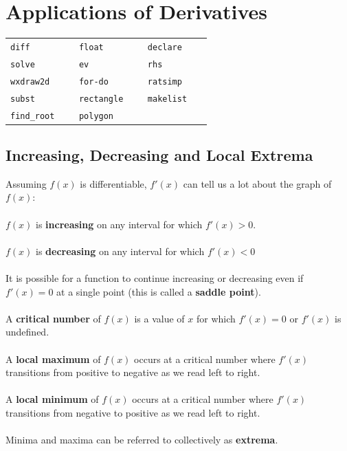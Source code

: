 \documentclass[10.5pt,twoside]{report}
\theoremstyle{definition}
\begin{document}
\pagebreak

\chapter{Applications of Derivatives}

\vspace*{\fill}

\minitoc

\vspace*{\fill}


\newline
\newline

\begin{tabular}{l l l}
 \verb|diff   |   &\verb|float   |   &\verb|declare   |   \\
 \verb|solve   |   &\verb|ev   |   &\verb|rhs   |   \\
 \verb|wxdraw2d   |   &\verb|for-do   |   &\verb|ratsimp   |   \\
 \verb|subst   |   &\verb|rectangle   |   &\verb|makelist   |   \\
 \verb|find_root   |   &\verb|polygon   |   &\verb|   |   \\
\end{tabular}



\pagebreak


\section{Increasing, Decreasing and Local Extrema}\label{Increasing, Decreasing and Local Extrema}

Assuming $f(x)$ is differentiable, $f'(x)$ can tell us a lot about the graph of $f(x)$:\\
${}$\\
$f(x)$ is \textbf{increasing} on any interval for which $f'(x)>0$.\\
${}$\\
$f(x)$ is \textbf{decreasing} on any interval for which $f'(x)<0$\\
${}$\\
It is possible for a function to continue increasing or decreasing even if $f'(x)=0$ at a single point (this is called a \textbf{saddle point}).\\
${}$\\

A \textbf{critical number} of $f(x)$ is a value of $x$ for which $f'(x)=0$ or $f'(x)$ is undefined.\\
${}$\\
A \textbf{local maximum} of $f(x)$ occurs at a critical number where $f'(x)$ transitions from positive to negative as we read left to right.\\
${}$\\
A \textbf{local minimum} of $f(x)$ occurs at a critical number where $f'(x)$ transitions from negative to positive as we read left to right.\\
${}$\\
Minima and maxima can be referred to collectively as \textbf{extrema}.\\
\end{document}
